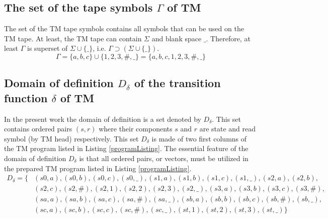 \documentclass[12pt, a4paper, bibliography=totocnumbered]{report}
\begin{document}
	\subsection{The set of the tape symbols $ \Gamma $ of TM}
	The set of the TM tape symbols contains all symbols that can be used on the TM tape. At least, the TM tape can contain $ \Sigma $ and blank space $ \_ $. Therefore, at least $ \Gamma $ is superset of $ \Sigma \cup \{\_\} $, i.e. $ \Gamma \supset (\Sigma \cup \{\_\}) $.
		\begin{equation} \label{eq:Gamma}
			\Gamma = \{ a, b, c \} \cup \{1, 2, 3, \#, \_ \} = \{a, b, c, 1, 2, 3, \#, \_ \}
		\end{equation}
	
	\subsection{Domain of definition $ D_{\delta} $ of the transition function $ \delta $ of TM}
	In the present work the domain of definition is a set denoted by $ D_{\delta} $. This set contains ordered pairs $ (s, r) $ where  their components $ s $ and $ r $ are state and read symbol (by TM head) respectively. This set $ D_{\delta} $ is made of two first columns of the TM program listed in Listing \ref{programListing}. The essential feature of the domain of definition $ D_{\delta} $ is that all ordered pairs, or vectors, must be utilized in the prepared TM program listed in Listing \ref{programListing}.
	\begin{equation}
	\begin{aligned}
	\label{eq:domain}
		D_{\delta} = \{ & (s0, a), (s0, b), (s0, c), (s0, \_), (s1, a), (s1, b), (s1, c), (s1, \_), (s2, a), (s2, b), \\
		       & (s2, c), (s2, \#), (s2, 1), (s2, 2), (s2, 3), (s2, \_), (s3, a), (s3, b), (s3, c), (s3, \#),   \\
		       & (sa, a), (sa, b), (sa, c), (sa, \#), (sa, \_), (sb, a), (sb, b), (sb, c), (sb, \#), (sb, \_),  \\
		       & (sc, a), (sc, b), (sc, c), (sc, \#), (sc, \_), (st, 1), (st, 2), (st, 3), (st, \_) \}
	\end{aligned}
	\end{equation}
\end{document}
